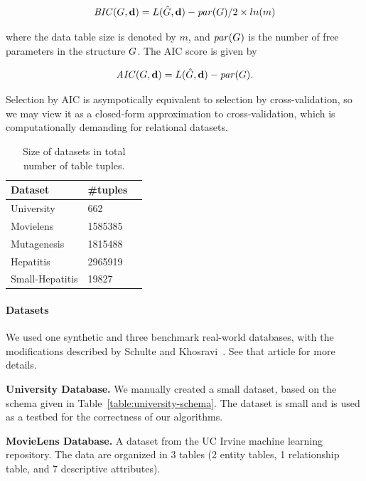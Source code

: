 \documentclass[runningheads,a4paper]{llncs}
\begin{document}
$$\mathit{BIC}(G,\mathbf{d}) = L(\hat{G},\mathbf{d}) - \mathit{par}(G)/2 \times ln(m)$$

where the data table size is denoted by $m$, and $\mathit{par}(G)$ is the number of free parameters in the structure $G$. The AIC score is given by 

$$\mathit{AIC}(G,\mathbf{d}) = L(\hat{G},\mathbf{d}) - \mathit{par}(G). $$

 Selection by AIC is asympotically equivalent to selection by cross-validation, so we may view it as a closed-form approximation to cross-validation,  which is computationally demanding for relational datasets. 

\begin{table}[btp] \centering
\begin{tabular}[c]
{|p{4cm}|p{3cm}|l|}\hline
    \textbf{Dataset} & \textbf{\#tuples} \\\hline
    University&662\\\hline
    Movielens &1585385\\\hline
    Mutagenesis &1815488\\\hline
    Hepatitis &2965919\\\hline
    Small-Hepatitis & 19827 \\\hline
\end{tabular}
\setlength{\abovecaptionskip}{10pt}
\caption{Size of datasets in total number of table tuples. 
 \label{table:datasetsize}}
\end{table}



\paragraph{Datasets}


We used one synthetic and 
three benchmark real-world databases, with the modifications described by Schulte and Khosravi~\cite{Schulte2012}. See that article for more
details.


\noindent\textbf{University Database.} We manually created a small dataset, based on the schema given in Table~\ref{table:university-schema}. 
The dataset is small and is used as a testbed for the correctness of our algorithms.

\noindent\textbf{MovieLens Database.} A dataset from the UC Irvine machine learning repository. The data are organized in 3 tables (2 entity tables, 1 relationship table, and 7 descriptive attributes). 
\end{document}
